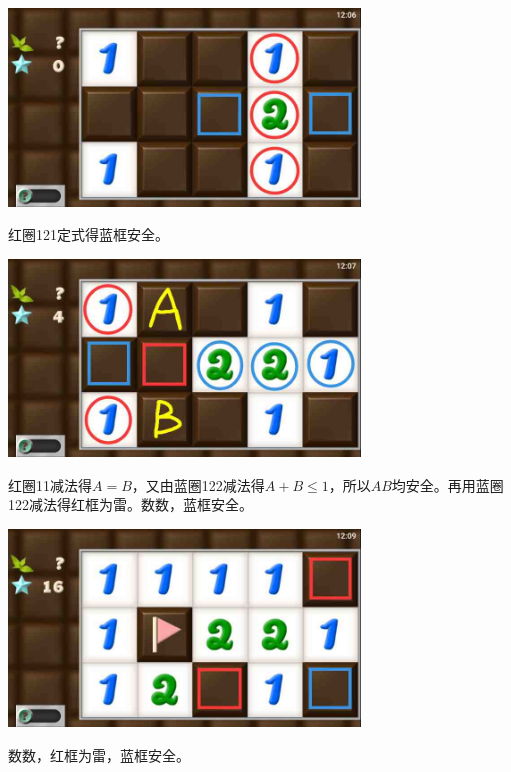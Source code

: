 \subsection{} %
\begin{center}
    \includegraphics[width=0.7\textwidth]{puzzlelow/80-1.jpg}
\end{center}
红圈121定式得蓝框安全。
\begin{center}
    \includegraphics[width=0.7\textwidth]{puzzlelow/80-2.jpg}
\end{center}
红圈11减法得$A=B$，又由蓝圈122减法得$A+B\le 1$，所以$AB$均安全。再用蓝圈122减法得红框为雷。数数，蓝框安全。
\begin{center}
    \includegraphics[width=0.7\textwidth]{puzzlelow/80-3.jpg}
\end{center}
数数，红框为雷，蓝框安全。

